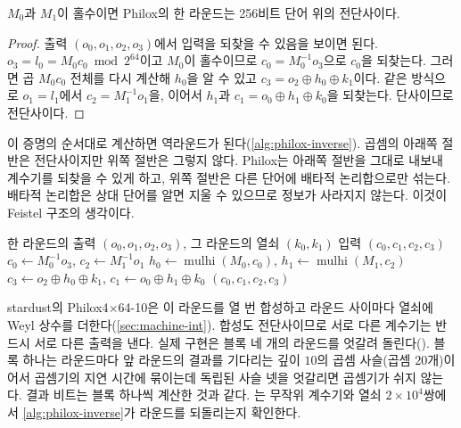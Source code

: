 \begin{proposition}
\label{prop:philox-round}
$M_0$과 $M_1$이 홀수이면 Philox의 한 라운드는 256비트 단어 위의 전단사이다.
\end{proposition}

\begin{proof}
출력 $(o_0,o_1,o_2,o_3)$에서 입력을 되찾을 수 있음을 보이면 된다. $o_3=l_0=M_0c_0\bmod2^{64}$이고 $M_0$이 홀수이므로 $c_0=M_0^{-1}o_3$으로 $c_0$을 되찾는다. 그러면 곱 $M_0c_0$ 전체를 다시 계산해 $h_0$을 알 수 있고 $c_3=o_2\oplus h_0\oplus k_1$이다. 같은 방식으로 $o_1=l_1$에서 $c_2=M_1^{-1}o_1$을, 이어서 $h_1$과 $c_1=o_0\oplus h_1\oplus k_0$을 되찾는다. 단사이므로 전단사이다.
\end{proof}

이 증명의 순서대로 계산하면 역라운드가 된다(\cref{alg:philox-inverse}). 곱셈의 아래쪽 절반은 전단사이지만 위쪽 절반은 그렇지 않다. Philox는 아래쪽 절반을 그대로 내보내 계수기를 되찾을 수 있게 하고, 위쪽 절반은 다른 단어에 배타적 논리합으로만 섞는다. 배타적 논리합은 상대 단어를 알면 지울 수 있으므로 정보가 사라지지 않는다. 이것이 Feistel 구조의 생각이다.

\begin{algorithm}[htbp]
\begin{algorithmic}[1]
\Require 한 라운드의 출력 $(o_0,o_1,o_2,o_3)$, 그 라운드의 열쇠 $(k_0,k_1)$
\Ensure 입력 $(c_0,c_1,c_2,c_3)$
\State $c_0\gets M_0^{-1}o_3$, $c_2\gets M_1^{-1}o_1$ 
\State $h_0\gets\operatorname{mulhi}(M_0,c_0)$, $h_1\gets\operatorname{mulhi}(M_1,c_2)$ 
\State $c_3\gets o_2\oplus h_0\oplus k_1$, $c_1\gets o_0\oplus h_1\oplus k_0$
\State \Return $(c_0,c_1,c_2,c_3)$
\end{algorithmic}
\caption{Philox 한 라운드의 역}
\label{alg:philox-inverse}
\end{algorithm}

stardust의 Philox4$\times$64-10은 이 라운드를 열 번 합성하고 라운드 사이마다 열쇠에 Weyl 상수를 더한다(\cref{sec:machine-int}). 합성도 전단사이므로 서로 다른 계수기는 반드시 서로 다른 출력을 낸다. 실제 구현은 블록 네 개의 라운드를 엇갈려 돌린다(). 블록 하나는 라운드마다 앞 라운드의 결과를 기다리는 깊이 $10$의 곱셈 사슬(곱셈 $20$개)이어서 곱셈기의 지연 시간에 묶이는데 독립된 사슬 넷을 엇갈리면 곱셈기가 쉬지 않는다. 결과 비트는 블록 하나씩 계산한 것과 같다. 는 무작위 계수기와 열쇠 $2\times10^4$쌍에서 \cref{alg:philox-inverse}가 라운드를 되돌리는지 확인한다.

